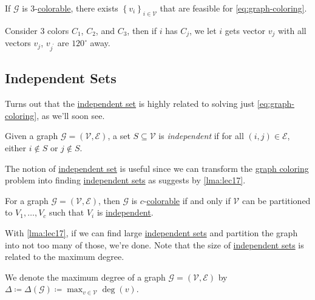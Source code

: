 \begin{claim}
	If \(\mathcal{G} \) is \(3\)-\hyperref[def:coloring]{colorable}, there exists \(\left\{ v_i \right\}_{i\in \mathcal{V} } \) that are feasible for \autoref{eq:graph-coloring}.
\end{claim}
\begin{explanation}
	Consider \(3\) colors \(C_1\), \(C_2\), and \(C_3\), then if \(i\) has \(C_j\), we let \(i\) gets vector \(v_j\) with all vectors \(v_j\), \(v_{j^\prime }\) are \(120^{\circ } \) away.
	\begin{center}
	\end{center}
\end{explanation}

\subsection{Independent Sets}
Turns out that the \hyperref[def:independent-set]{independent set} is highly related to solving just \autoref{eq:graph-coloring}, as we'll soon see.

\begin{definition}\label{def:independent-set}
	Given a graph \(\mathcal{G} =(\mathcal{V} , \mathcal{E} )\), a set \(S \subseteq \mathcal{V} \) is \emph{independent} if for all \((i, j)\in \mathcal{E} \), either \(i \notin S\) or \(j \notin S\).
\end{definition}

The notion of \hyperref[def:independent-set]{independent set} is useful since we can transform the \hyperref[prb:graph-coloring]{graph coloring} problem into finding \hyperref[def:independent-set]{independent sets} as suggests by \autoref{lma:lec17}.

\begin{lemma}\label{lma:lec17}
	For a graph \(\mathcal{G} = (\mathcal{V} , \mathcal{E} )\), then \(\mathcal{G} \) is \(c\)-\hyperref[def:coloring]{colorable} if and only if \(\mathcal{V} \) can be partitioned to \(V_1, \dots, V_c\) such that \(V_i\) is \hyperref[def:independent-set]{independent}.
\end{lemma}

With \autoref{lma:lec17}, if we can find large \hyperref[def:independent-set]{independent sets} and partition the graph into not too many of those, we're done. Note that the size of \hyperref[def:independent-set]{independent sets} is related to the maximum degree.

\begin{notation}
	We denote the maximum degree of a graph \(\mathcal{G}=(\mathcal{V} , \mathcal{E} ) \) by \(\Delta \coloneqq \Delta (\mathcal{G} )\coloneqq \max_{v\in \mathcal{V} } \deg(v)\).
\end{notation}

